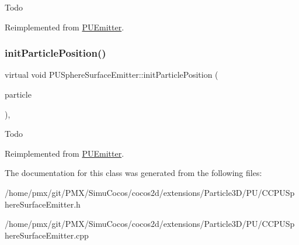 Todo 

Reimplemented from \hyperlink{classPUEmitter_a2449f31b73c94a55f6559be71d56ca61}{P\+U\+Emitter}.

\mbox{\label{classPUSphereSurfaceEmitter_a03a5b2d1d21c867c4f22a127555eeb46}} 
\subsubsection{\texorpdfstring{init\+Particle\+Position()}{initParticlePosition()}\hspace{0.1cm}{\footnotesize\ttfamily [2/2]}}
{\footnotesize\ttfamily virtual void P\+U\+Sphere\+Surface\+Emitter\+::init\+Particle\+Position (\begin{DoxyParamCaption}\item[{\hyperlink{structPUParticle3D}{P\+U\+Particle3D} $\ast$}]{particle }\end{DoxyParamCaption})\hspace{0.3cm}{\ttfamily [override]}, {\ttfamily [virtual]}}

Todo 

Reimplemented from \hyperlink{classPUEmitter_a2449f31b73c94a55f6559be71d56ca61}{P\+U\+Emitter}.



The documentation for this class was generated from the following files\+:\begin{DoxyCompactItemize}
\item 
/home/pmx/git/\+P\+M\+X/\+Simu\+Cocos/cocos2d/extensions/\+Particle3\+D/\+P\+U/C\+C\+P\+U\+Sphere\+Surface\+Emitter.\+h\item 
/home/pmx/git/\+P\+M\+X/\+Simu\+Cocos/cocos2d/extensions/\+Particle3\+D/\+P\+U/C\+C\+P\+U\+Sphere\+Surface\+Emitter.\+cpp\end{DoxyCompactItemize}
